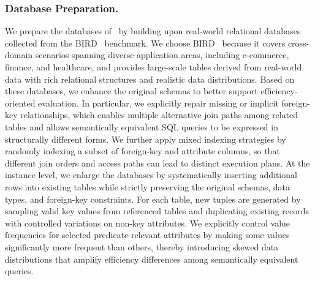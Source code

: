 \subsubsection{Database Preparation.}
We prepare the databases of \benchmark\ by building upon real-world relational databases collected from the \textsc{BIRD}~\cite{li2023can} benchmark.
We choose \textsc{BIRD}~\cite{li2023can} because it covers cross-domain scenarios spanning diverse application areas, including e-commerce, finance, and healthcare, and provides large-scale tables derived from real-world data with rich relational structures and realistic data distributions.
Based on these databases, we enhance the original schemas to better support efficiency-oriented evaluation.
In particular, we explicitly repair missing or implicit foreign-key relationships, which enables multiple alternative join paths among related tables and allows semantically equivalent SQL queries to be expressed in structurally different forms.
We further apply mixed indexing strategies by randomly indexing a subset of foreign-key and attribute columns, so that different join orders and access paths can lead to distinct execution plans. 
At the instance level, we enlarge the databases by systematically inserting additional rows into existing tables while strictly preserving the original schemas, data types, and foreign-key constraints.
For each table, new tuples are generated by sampling valid key values from referenced tables and duplicating existing records with controlled variations on non-key attributes.
We explicitly control value frequencies for selected predicate-relevant attributes by making some values significantly more frequent than others, thereby introducing skewed data distributions that amplify efficiency differences among semantically equivalent queries.


